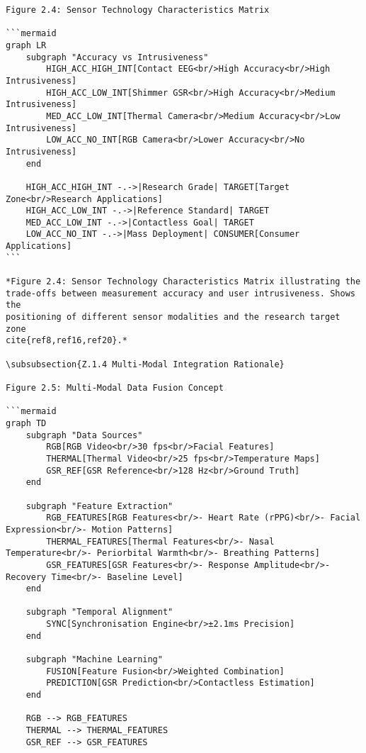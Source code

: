 \begin{verbatim}
Figure 2.4: Sensor Technology Characteristics Matrix

```mermaid
graph LR
    subgraph "Accuracy vs Intrusiveness"
        HIGH_ACC_HIGH_INT[Contact EEG<br/>High Accuracy<br/>High Intrusiveness]
        HIGH_ACC_LOW_INT[Shimmer GSR<br/>High Accuracy<br/>Medium Intrusiveness]
        MED_ACC_LOW_INT[Thermal Camera<br/>Medium Accuracy<br/>Low Intrusiveness]
        LOW_ACC_NO_INT[RGB Camera<br/>Lower Accuracy<br/>No Intrusiveness]
    end

    HIGH_ACC_HIGH_INT -.->|Research Grade| TARGET[Target Zone<br/>Research Applications]
    HIGH_ACC_LOW_INT -.->|Reference Standard| TARGET
    MED_ACC_LOW_INT -.->|Contactless Goal| TARGET
    LOW_ACC_NO_INT -.->|Mass Deployment| CONSUMER[Consumer Applications]
```

*Figure 2.4: Sensor Technology Characteristics Matrix illustrating the
trade-offs between measurement accuracy and user intrusiveness. Shows the
positioning of different sensor modalities and the research target zone
cite{ref8,ref16,ref20}.*

\subsubsection{Z.1.4 Multi-Modal Integration Rationale}

Figure 2.5: Multi-Modal Data Fusion Concept

```mermaid
graph TD
    subgraph "Data Sources"
        RGB[RGB Video<br/>30 fps<br/>Facial Features]
        THERMAL[Thermal Video<br/>25 fps<br/>Temperature Maps]
        GSR_REF[GSR Reference<br/>128 Hz<br/>Ground Truth]
    end

    subgraph "Feature Extraction"
        RGB_FEATURES[RGB Features<br/>- Heart Rate (rPPG)<br/>- Facial Expression<br/>- Motion Patterns]
        THERMAL_FEATURES[Thermal Features<br/>- Nasal Temperature<br/>- Periorbital Warmth<br/>- Breathing Patterns]
        GSR_FEATURES[GSR Features<br/>- Response Amplitude<br/>- Recovery Time<br/>- Baseline Level]
    end

    subgraph "Temporal Alignment"
        SYNC[Synchronisation Engine<br/>±2.1ms Precision]
    end

    subgraph "Machine Learning"
        FUSION[Feature Fusion<br/>Weighted Combination]
        PREDICTION[GSR Prediction<br/>Contactless Estimation]
    end

    RGB --> RGB_FEATURES
    THERMAL --> THERMAL_FEATURES
    GSR_REF --> GSR_FEATURES


\end{verbatim}
